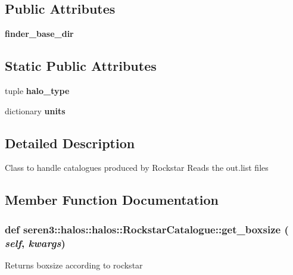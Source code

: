 \subsection*{Public Attributes}
\begin{DoxyCompactItemize}
\item 
\hypertarget{classseren3_1_1halos_1_1halos_1_1RockstarCatalogue_a2141d834ef7ccf6d4251f6a5b6bf90b4}{
{\bfseries finder\_\-base\_\-dir}}
\label{classseren3_1_1halos_1_1halos_1_1RockstarCatalogue_a2141d834ef7ccf6d4251f6a5b6bf90b4}

\end{DoxyCompactItemize}
\subsection*{Static Public Attributes}
\begin{DoxyCompactItemize}
\item 
tuple {\bfseries halo\_\-type}
\item 
dictionary {\bfseries units}
\end{DoxyCompactItemize}


\subsection{Detailed Description}
\begin{DoxyVerb}
Class to handle catalogues produced by Rockstar
Reads the out.list files
\end{DoxyVerb}
 

\subsection{Member Function Documentation}
\hypertarget{classseren3_1_1halos_1_1halos_1_1RockstarCatalogue_a648f766d002674cc441e36260c98b02f}{
\subsubsection[{get\_\-boxsize}]{\setlength{\rightskip}{0pt plus 5cm}def seren3::halos::halos::RockstarCatalogue::get\_\-boxsize ( {\em self}, \/   {\em kwargs})}}
\label{classseren3_1_1halos_1_1halos_1_1RockstarCatalogue_a648f766d002674cc441e36260c98b02f}
\begin{DoxyVerb}
Returns boxsize according to rockstar
\end{DoxyVerb}
 

